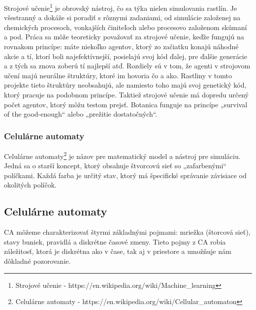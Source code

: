 \documentclass[12pt]{article}
\begin{document}
Strojové učenie\footnote{
	Strojové učenie - https://en.wikipedia.org/wiki/Machine\_learning
	}
je obrovský nástroj, čo sa týka nielen simulovania rastlín.
Je všestranný a dokáže si poradiť s rôznymi zadaniami, od simulácie
založenej na chemických procesoch, vonkajších činiteľoch alebo
procesovo založenom skúmaní a pod.
Práca
sa môže teoreticky považovať za strojové
učenie, keďže fungujú na rovnakom princípe: máte niekoľko agentov, ktorý
zo začiatku konajú náhodné akcie a tí, ktorí boli najefektívnejší,
posielajú svoj kód ďalej, pre ďalšie generácie a z tých sa znova zoberú
tí najlepší atď.
Rozdiely %
sú v tom, že agenti v strojovom učení majú
neurálne štruktúry, ktoré im hovoria čo a ako. Rastliny v tomto projekte
tieto štruktúry neobsahujú, ale namiesto toho majú svoj genetický kód,
ktorý pracuje na podobnom princípe.
Taktiež %
strojové učenie má dopredu
určený počet agentov, ktorý môžu testom prejsť. Botanica funguje na
princípe „survival of the good-enough“ alebo „prežitie dostatočných“.

\subsubsection{Celulárne automaty}

Celulárne automaty\footnote{
	Celulárne automaty - https://en.wikipedia.org/wiki/Cellular\_automaton
	}
je názov pre matematický model a nástroj pre
simuláciu. Jedná sa o starší koncept, ktorý obsahuje štvorcovú sieť
so „zafarbenými“ políčkami. Každá farba je určitý stav, ktorý má špecifické
správanie závisiace od okolitých políčok.


\newpage %
\subsection{Celulárne automaty}

CA môžeme charakterizovať štyrmi základnými pojmami: mriežka (štorcová sieť),
stavy buniek, pravidlá a diskrétne časové zmeny.
Tieto pojmy z CA robia záležitosť, ktorá je diskrétna ako v čase, tak aj v
priestore a umožňuje nám dôkladné pozorovanie. %
\end{document}
